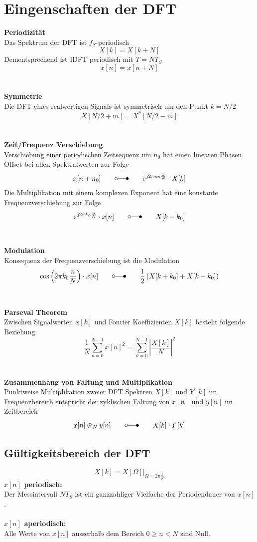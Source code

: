 \section{Eingenschaften der DFT}
\textbf{Periodizität}\\
Das Spektrum der DFT ist $f_S$-periodisch
\[ X[k] = X[k+N] \]
Dementsprechend ist IDFT periodisch mit $T=NT_S$
\[ x[n] = x[n+N] \]\\
\\
\textbf{Symmetrie}\\
Die DFT eines realwertigen Signals ist symmetrisch um den Punkt $k=N/2$
\[ X[N/2+m] = X^*[N/2-m] \]\\
\\
\textbf{Zeit/Frequenz Verschiebung}\\
Verschiebung einer periodischen Zeitsequenz um $n_0$ hat einen linearen Phasen
Offset bei allen Spektralwerten zur Folge
\[ x[n+n_0] \qquad \laplace \qquad \e^{\im 2\pi n_0 \frac{k}{N}} \cdot X[k] \]
Die Multiplikation mit einem komplexen Exponent hat eine konstante
Frequenzverschiebung zur Folge
\[ \e^{\im 2\pi k_0 \frac{n}{N}} \cdot x[n] \qquad \laplace \qquad X[k-k_0] \]\\
\\
\textbf{Modulation}\\
Konsequenz der Frequenzverschiebung ist die Modulation
\[ \cos\left(2\pi k_0\frac{n}{N}\right) \cdot x[n] \qquad\laplace\qquad
	\frac{1}{2}\left( X[k+k_0] + X[k-k_0] \right) \]\\
\\
\textbf{Parseval Theorem}\\
Zwischen Signalwerten $x[k]$ und Fourier Koeffizienten $X[k]$ besteht folgende
Beziehung:
\[ \frac{1}{N} \sum_{n=0}^{N-1}x[n]^2 = \sum_{k=0}^{N-1}\left| 
	\frac{X[k]}{N} \right|^2  \]\\
\\
\textbf{Zusammenhang von Faltung und Multiplikation}\\
Punktweise Multiplikation zweier DFT Spektren $X[k]$ und $Y[k]$ im 
Frequenzbereich entspricht der zyklischen Faltung von $x[n]$ und $y[n]$ im 
Zeitbereich
\[ x[n] \circledast_N y[n] \qquad\laplace\qquad X[k]\cdot Y[k] \]

\subsection{Gültigkeitsbereich der DFT}
\[ X[k] = X[\Omega]|_{\Omega=2\pi\frac{k}{N}} \]
\textbf{$x[n]$ periodisch:}\\
Der Messintervall $NT_S$ ist ein ganzzahliger Vielfache der Periodendauer
von $x[n] $.\\
\\
\textbf{$x[n]$ aperiodisch:}\\
Alle Werte von $x[n]$ ausserhalb dem Bereich $0\geq n<N$ sind Null.

